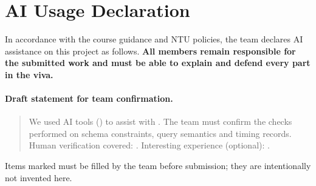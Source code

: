 \section{AI Usage Declaration}

In accordance with the course guidance and NTU policies, the team declares AI assistance on this project as follows.
\textbf{All members remain responsible for the submitted work and must be able to explain and defend every part in the viva.}

\paragraph{Draft statement for team confirmation.}
\begin{quote}
\small
We used AI tools () to assist with .
The team must confirm the checks performed on schema constraints, query semantics and timing records.
Human verification covered: .
Interesting experience (optional): .
\end{quote}

Items marked \TODO{\ldots} must be filled by the team before submission; they are intentionally not invented here.
